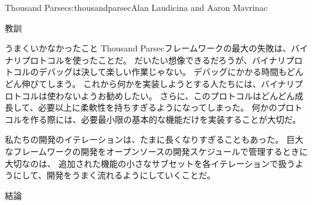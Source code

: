 \begin{aosachapter}{Thousand Parsec}{s:thousandparsec}{Alan Laudicina and Aaron Mavrinac}
\begin{aosasect1}{教訓}
\begin{aosasect2}{うまくいかなかったこと}
Thousand Parsecフレームワークの最大の失敗は、バイナリプロトコルを使ったことだ。
だいたい想像できるだろうが、バイナリプロトコルのデバッグは決して楽しい作業じゃない。
デバッグにかかる時間もどんどん伸びてしまう。
これから何かを実装しようとする人たちには、バイナリプロトコルは使わないようお勧めしたい。
さらに、このプロトコルはどんどん成長して、必要以上に柔軟性を持ちすぎるようになってしまった。
何かのプロトコルを作る際には、必要最小限の基本的な機能だけを実装することが大切だ。

私たちの開発のイテレーションは、たまに長くなりすぎることもあった。
巨大なフレームワークの開発をオープンソースの開発スケジュールで管理するときに大切なのは、
追加された機能の小さなサブセットを各イテレーションで扱うようにして、開発をうまく流れるようにしていくことだ。

\end{aosasect2}

\begin{aosasect2}{結論}


\end{aosasect2}
\end{aosasect1}
\end{aosachapter}
